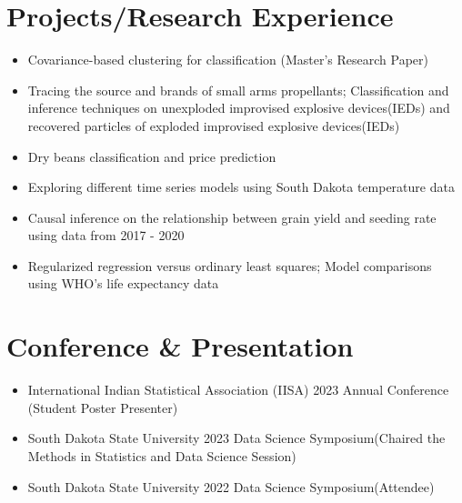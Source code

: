 \documentclass[letterpaper,11pt]{article}
\newcommand{\resumeItem}[2]{
  \item[]\normalsize{
    {#1}{ #2 \vspace{-2pt}}
  }
}
\newcommand{\resumeSubItem}[2]{\resumeItem{#1}{#2}\vspace{-4pt}}
\newcommand{\resumeSubHeadingListStart}{\begin{itemize}[leftmargin=0pt]}
\newcommand{\resumeSubHeadingListEnd}{\end{itemize}}
\begin{document}
\section{Projects/Research Experience}
  \resumeSubHeadingListStart
      \item Covariance-based clustering for classification \qquad \qquad \qquad \hspace{4.2cm} (Master's Research Paper)\vspace{-10pt}
      \item Tracing the source and brands of small arms propellants; Classification and inference techniques on unexploded improvised explosive devices(IEDs) and recovered particles of exploded improvised explosive devices(IEDs)\vspace{-10pt}
      \item Dry beans classification and price prediction\vspace{-10pt}
      \item Exploring different time series models using South Dakota temperature data\vspace{-10pt}
      \item Causal inference on the relationship between grain yield and seeding rate using data from 2017 - 2020\vspace{-10pt}
      \item Regularized regression versus ordinary least squares; Model comparisons using WHO's life expectancy data
  \resumeSubHeadingListEnd


\section{Conference \& Presentation}
\resumeSubHeadingListStart
 \item International Indian Statistical Association (IISA) 2023 Annual Conference (Student Poster Presenter)\vspace{-.35cm}
 \item South Dakota State University 2023 Data Science Symposium(Chaired the Methods in Statistics and Data Science Session)\vspace{-.35cm}
 \item South Dakota State University 2022 Data Science Symposium(Attendee)%
\resumeSubHeadingListEnd
\end{document}
